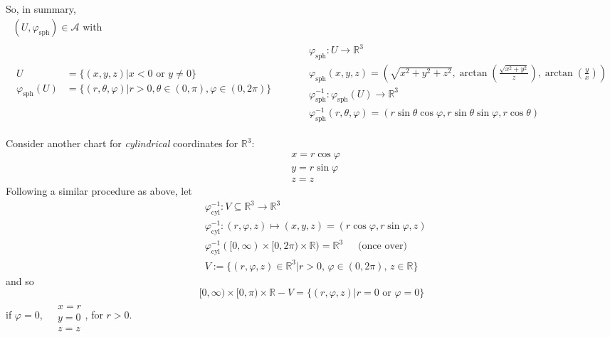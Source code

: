 \documentclass[10pt, twoside]{amsart}
\begin{document}
\begin{multicols*}{2}
So, in summary, 
\begin{equation} \label{Eq:UsphericalR3}
\begin{gathered}
  (U, \varphi_{\text{sph}}) \in \mathcal{A} \text{ with } \\
  \begin{aligned}
    U & = \lbrace ( x,y,z) | x < 0 \text{ or } y \neq 0 \rbrace \\
    \varphi_{\text{sph}}(U) & = \lbrace (r, \theta,\varphi) | r>0 , \theta \in (0,\pi), \varphi \in (0,2\pi) \rbrace
\end{aligned} \quad \quad \, \begin{aligned}
    & \varphi_{\text{sph}} : U \to \mathbb{R}^3 \\ 
    & \varphi_{\text{sph}}(x,y,z) = ( \sqrt{ x^2 + y^2 + z^2 }, \arctan{ \left( \frac{ \sqrt{ x^2 + y^2}}{z} \right) }, \arctan{ \left( \frac{y}{x} \right) } ) \\ 
    & \varphi_{\text{sph}}^{-1} : \varphi_{\text{sph}}(U) \to \mathbb{R}^3 \\ 
    & \varphi_{\text{sph}}^{-1}(r,\theta,\varphi) = (r\sin{\theta} \cos{\varphi}, r\sin{\theta} \sin{\varphi}, r\cos{\theta} )
\end{aligned}
\end{gathered}
\end{equation}

Consider another chart for \emph{cylindrical} coordinates for $\mathbb{R}^3$:
\begin{equation}\label{Eq:R3cylindricalcoordinates}
\begin{aligned}
  & x = r\cos{\varphi} \\ 
  & y = r\sin{\varphi} \\ 
  & z = z
\end{aligned}
\end{equation}
Following a similar procedure as above, let
\[
\begin{aligned}
  & \varphi_{\text{cyl}}^{-1} : V \subseteq \mathbb{R}^3 \to \mathbb{R}^3 \\ 
  & \varphi_{\text{cyl}}^{-1}:(r,\varphi,z) \mapsto (x,y,z) = (r\cos{\varphi},r\sin{\varphi},z)\\ 
  & \varphi_{\text{cyl}}^{-1}([0,\infty)\times [0,2\pi) \times \mathbb{R}) = \mathbb{R}^3 \quad \, \text{ (once over) } \\ 
      & V := \lbrace (r,\varphi,z) \in \mathbb{R}^3 | r>0 , \, \varphi \in (0,2\pi), \, z \in \mathbb{R} \rbrace
\end{aligned}
\]
and so
\[
[0,\infty) \times [0,\pi) \times \mathbb{R} - V = \lbrace (r, \varphi,z) | r=0 \text{ or } \varphi =0 \rbrace 
\]
if $\varphi =0$, $\begin{aligned} & \quad \\
  & x = r \\
  & y = 0 \\
  & z = z \end{aligned}$, for $r>0$.  


\end{multicols*}
\end{document}

